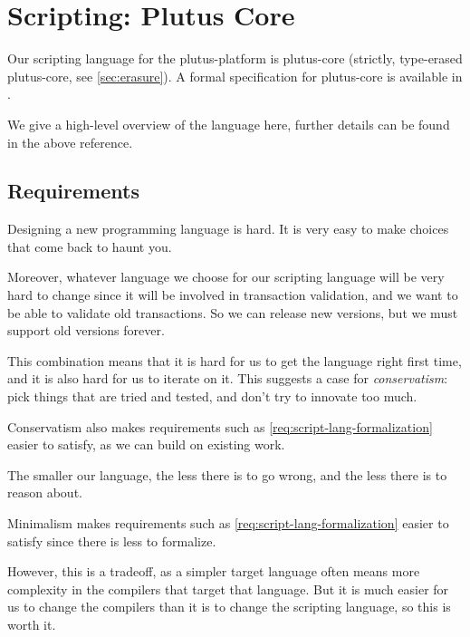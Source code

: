 \section{Scripting: Plutus Core}
\label{sec:plutus-core}

Our scripting language for the \gls{plutus-platform} is \gls{plutus-core} (strictly, type-erased \gls{plutus-core}, see \cref{sec:erasure}).
A formal specification for \gls{plutus-core} is available in \textcite{plutus-core-spec}.

We give a high-level overview of the language here, further details can be found in the above reference.

\subsection{Requirements}
\begin{requirement}[Conservatism]
\label{req:script-lang-conservatism}
Designing a new programming language is hard.
It is very easy to make choices that come back to haunt you.

Moreover, whatever language we choose for our scripting language will be very hard to change since it will be involved in transaction validation, and we want to be able to validate old transactions.
So we can release new versions, but we must support old versions forever.

This combination means that it is hard for us to get the language right first time, and it is also hard for us to iterate on it.
This suggests a case for \emph{conservatism}: pick things that are tried and tested, and don't try to innovate too much.

Conservatism also makes requirements such as \cref{req:script-lang-formalization} easier to satisfy, as we can build on existing work.
\end{requirement}

\begin{requirement}[Minimalism]
\label{req:script-lang-minimalism}
The smaller our language, the less there is to go wrong, and the less there is to reason about.

Minimalism makes requirements such as \cref{req:script-lang-formalization} easier to satisfy since there is less to formalize.

However, this is a tradeoff, as a simpler target language often means more complexity in the compilers that target that language.
But it is much easier for us to change the compilers than it is to change the scripting language, so this is worth it.
\end{requirement}

